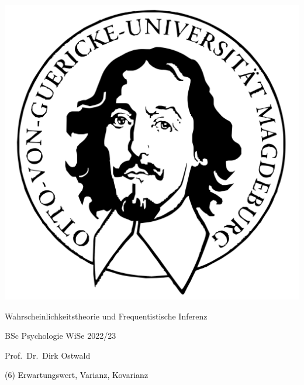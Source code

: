 \documentclass[
  8pt,
  ignorenonframetext,
]{beamer}
\author{}
\date{\vspace{-2.5em}}
\begin{document}
\begin{frame}[plain]{}
\protect\hypertarget{section}{}
\center

\begin{center}\includegraphics[width=0.2\linewidth]{6_Abbildungen/wtfi_6_otto} \end{center}

\vspace{2mm}

\Large

Wahrscheinlichkeitstheorie und Frequentistische Inferenz \vspace{6mm}

\large

BSc Psychologie WiSe 2022/23

\vspace{6mm}
\large

Prof.~Dr.~Dirk Ostwald
\end{frame}

\begin{frame}[plain]{}
\protect\hypertarget{section-1}{}
\vfill
\center
\huge

\textcolor{black}{(6) Erwartungswert, Varianz, Kovarianz} \vfill
\end{frame}
\end{document}
